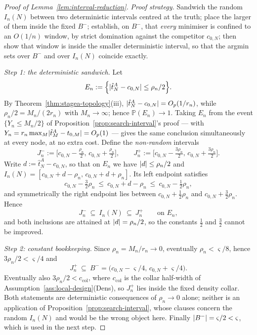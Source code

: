 \documentclass[11pt]{article}
\theoremstyle{plain}
\theoremstyle{definition}
\theoremstyle{remark}
\newcommand{\PP}{\mathbb{P}}
\DeclarePairedDelimiter{\abs}{\lvert}{\rvert}
\begin{document}
\begin{proof}[Proof of Lemma~\ref{lem:interval-reduction}]
\emph{Proof strategy.} Sandwich the random $I_n(N)$ between two deterministic
intervals centred at the truth; place the larger of them inside the fixed
$B^-$; establish, on $B^-$, that \emph{every} minimiser is confined to an
$O(1/n)$ window, by strict domination against the competitor $c_{0,N}$; then
show that window is inside the smaller deterministic interval, so that the
argmin sets over $B^-$ and over $I_n(N)$ coincide exactly.

\emph{Step 1: the deterministic sandwich.} Let
\[
  E_n:=\Bigl\{\abs{\hat t^A_N-c_{0,N}}\le\rho_n/2\Bigr\}.
\]
By Theorem~\ref{thm:stagea-topology}(iii),
$\abs{\hat t^A_N-c_{0,N}}=O_p(1/r_n)$, while $\rho_n/2=M_n/(2r_n)$ with
$M_n\to\infty$; hence $\PP(E_n)\to1$. Taking $E_n$ from the event
$\{Y_n\le M_n/2\}$ of Proposition~\ref{prop:search-interval}'s proof --- with
$Y_n=r_n\max_M\abs{\hat t^A_M-t_{0,M}}=O_p(1)$ --- gives the same conclusion
simultaneously at every node, at no extra cost. Define the \emph{non-random}
intervals
\[
  J_n^-:=\bigl[c_{0,N}-\tfrac{\rho_n}2,\,c_{0,N}+\tfrac{\rho_n}2\bigr],
  \qquad
  J_n^+:=\bigl[c_{0,N}-\tfrac{3\rho_n}2,\,c_{0,N}+\tfrac{3\rho_n}2\bigr].
\]
Write $d:=\hat t^A_N-c_{0,N}$, so that on $E_n$ we have $\abs d\le\rho_n/2$
and $I_n(N)=[c_{0,N}+d-\rho_n,\,c_{0,N}+d+\rho_n]$. Its left endpoint
satisfies
\[
  c_{0,N}-\tfrac32\rho_n
  \ \le\ c_{0,N}+d-\rho_n\ \le\
  c_{0,N}-\tfrac12\rho_n,
\]
and symmetrically the right endpoint lies between $c_{0,N}+\tfrac12\rho_n$ and
$c_{0,N}+\tfrac32\rho_n$. Hence
\[
  J_n^-\ \subseteq\ I_n(N)\ \subseteq\ J_n^+
  \qquad\text{on }E_n ,
\]
and both inclusions are attained at $\abs d=\rho_n/2$, so the constants
$\tfrac12$ and $\tfrac32$ cannot be improved.

\emph{Step 2: constant bookkeeping.} Since $\rho_n=M_n/r_n\to0$, eventually
$\rho_n<\varsigma/8$, hence $3\rho_n/2<\varsigma/4$ and
\[
  J_n^+\ \subseteq\ B^-=\bigl(c_{0,N}-\varsigma/4,\,c_{0,N}+\varsigma/4\bigr).
\]
Eventually also $3\rho_n/2<c_{\mathrm{col}}$, where $c_{\mathrm{col}}$ is the
collar half-width of Assumption~\ref{ass:local-design}(Dens), so $J_n^+$ lies
inside the fixed density collar. Both statements are deterministic
consequences of $\rho_n\to0$ alone; neither is an application of
Proposition~\ref{prop:search-interval}, whose clauses concern the random
$I_n(N)$ and would be the wrong object here. Finally
$\abs{B^-}=\varsigma/2<\varsigma$, which is used in the next step.


\end{proof}
\end{document}
